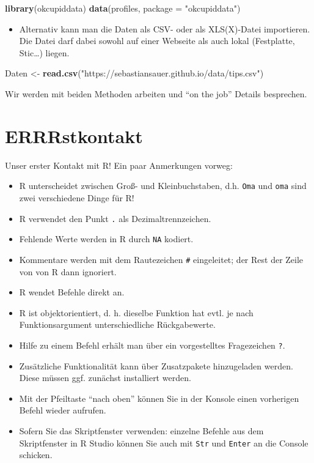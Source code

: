 \documentclass[12pt,]{book}
\makeatletter
\newenvironment{Shaded}{\begin{snugshade}}{\end{snugshade}}
\newcommand{\KeywordTok}[1]{\textcolor[rgb]{0.13,0.29,0.53}{\textbf{{#1}}}}
\newcommand{\DataTypeTok}[1]{\textcolor[rgb]{0.13,0.29,0.53}{{#1}}}
\newcommand{\StringTok}[1]{\textcolor[rgb]{0.31,0.60,0.02}{{#1}}}
\newcommand{\NormalTok}[1]{{#1}}
\providecommand{\tightlist}{%
  \setlength{\itemsep}{0pt}\setlength{\parskip}{0pt}}
\newenvironment{kframe}{%
\medskip{}
\setlength{\fboxsep}{.8em}
 \def\at@end@of@kframe{}%
 \ifinner\ifhmode%
  \def\at@end@of@kframe{\end{minipage}}%
  \begin{minipage}{\columnwidth}%
 \fi\fi%
 \def\FrameCommand##1{\hskip\@totalleftmargin \hskip-\fboxsep
 \colorbox{shadecolor}{##1}\hskip-\fboxsep
     \hskip-\linewidth \hskip-\@totalleftmargin \hskip\columnwidth}%
 \MakeFramed {\advance\hsize-\width
   \@totalleftmargin\z@ \linewidth\hsize
   \@setminipage}}%
 {\par\unskip\endMakeFramed%
 \at@end@of@kframe}
\renewenvironment{Shaded}{\begin{kframe}}{\end{kframe}}
\makeatother
\begin{document}
\begin{Shaded}
\begin{Highlighting}[]
\KeywordTok{library}\NormalTok{(okcupiddata) }\KeywordTok{data}\NormalTok{(profiles, }\DataTypeTok{package =} \StringTok{"okcupiddata"}\NormalTok{)}
\end{Highlighting}
\end{Shaded}

\begin{itemize}
\tightlist
\item
  Alternativ kann man die Daten als CSV- oder als XLS(X)-Datei
  importieren. Die Datei darf dabei sowohl auf einer Webseite als auch
  lokal (Festplatte, Stic\ldots{}) liegen.
\end{itemize}

\begin{Shaded}
\begin{Highlighting}[]
\NormalTok{Daten <-}\StringTok{ }
\KeywordTok{read.csv}\NormalTok{(}\StringTok{"https://sebastiansauer.github.io/data/tips.csv"}\NormalTok{) }
\end{Highlighting}
\end{Shaded}

Wir werden mit beiden Methoden arbeiten und ``on the job'' Details
besprechen.

\section{ERRRstkontakt}\label{errrstkontakt}

Unser erster Kontakt mit R! Ein paar Anmerkungen vorweg:

\begin{itemize}
\tightlist
\item
  R unterscheidet zwischen Groß- und Kleinbuchstaben, d.h. \texttt{Oma}
  und \texttt{oma} sind zwei verschiedene Dinge für R!
\item
  R verwendet den Punkt \texttt{.} als Dezimaltrennzeichen.
\item
  Fehlende Werte werden in R durch \texttt{NA} kodiert.
\item
  Kommentare werden mit dem Rautezeichen \texttt{\#} eingeleitet; der
  Rest der Zeile von von R dann ignoriert.
\item
  R wendet Befehle direkt an.
\item
  R ist objektorientiert, d. h. dieselbe Funktion hat evtl. je nach
  Funktionsargument unterschiedliche Rückgabewerte.
\item
  Hilfe zu einem Befehl erhält man über ein vorgestelltes Fragezeichen
  \texttt{?}.
\item
  Zusätzliche Funktionalität kann über Zusatzpakete hinzugeladen werden.
  Diese müssen ggf. zunächst installiert werden.
\item
  Mit der Pfeiltaste ``nach oben'' können Sie in der Konsole einen
  vorherigen Befehl wieder aufrufen.
\item
  Sofern Sie das Skriptfenster verwenden: einzelne Befehle aus dem
  Skriptfenster in R Studio können Sie auch mit \texttt{Str} und
  \texttt{Enter} an die Console schicken.
\end{itemize}
\end{document}
